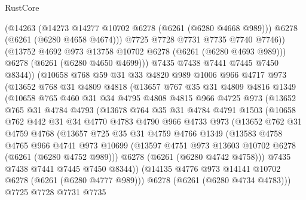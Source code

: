 \begin{lexlean}{RustCore}
\begin{coremodule}
              (@14263
                (@14273 @14277 @10702 @6278 (@6261 (@6280 @4668 @989)))
                @6278
                (@6261 (@6280 @4658 @4674)))
              @7725
              @7728
              @7731
              @7735
              @7740
              @7746))
          (@13752 @4692 @973 @13758 @10702 @6278 (@6261 (@6280 @4693 @989)))
          @6278
          (@6261 (@6280 @4650 @4699)))
        @7435
        @7438
        @7441
        @7445
        @7450
        @8344))
    (@10658
      @768
      @59
      @31
      @33
      @4820
      @989
      @1006
      @966
      @4717
      @973
      (@13652
        @768
        @31
        @4809
        @4818
        (@13657
          @767
          @35
          @31
          @4809
          @4816
          @1349
          (@10658
            @765
            @460
            @31
            @34
            @4795
            @4808
            @4815
            @966
            @4725
            @973
            (@13652
              @765
              @31
              @4784
              @4793
              (@13678
                @764
                @35
                @31
                @4784
                @4791
                @1503
                (@10658
                  @762
                  @442
                  @31
                  @34
                  @4770
                  @4783
                  @4790
                  @966
                  @4733
                  @973
                  (@13652
                    @762
                    @31
                    @4759
                    @4768
                    (@13657
                      @725
                      @35
                      @31
                      @4759
                      @4766
                      @1349
                      (@13583
                        @4758
                        @4765
                        @966
                        @4741
                        @973
                        @10699
                        (@13597 @4751 @973 @13603 @10702 @6278 (@6261 (@6280 @4752 @989)))
                        @6278
                        (@6261 (@6280 @4742 @4758)))
                      @7435
                      @7438
                      @7441
                      @7445
                      @7450
                      @8344))
                  (@14135 @4776 @973 @14141 @10702 @6278 (@6261 (@6280 @4777 @989)))
                  @6278
                  (@6261 (@6280 @4734 @4783)))
                @7725
                @7728
                @7731
                @7735

\end{coremodule}
\end{lexlean}
